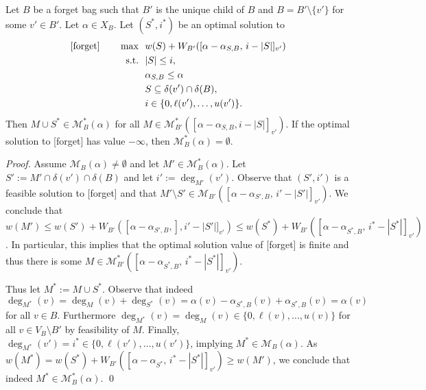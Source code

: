 \documentclass{llncs}
\begin{document}
\begin{lemma}\label{lem:forget}
	Let $B$ be a forget bag such that $B'$ is the unique child of $B$ and $B = B' \setminus \{v'\}$ for some $v' \in B'$. Let $\alpha \in X_B$. 
	Let $(S^*, i^*)$ be an optimal solution to
	\begin{align*}
	  \textup{[forget]}\qquad\max \ \ & w(S) + W_{B'}([\alpha - \alpha_{S, B},\, i - |S|]_{v'})\\
	  \textup{s.t.} \ \ & |S| \leq i,\\
	  & \alpha_{S, B} \leq \alpha\\
	  & S \subseteq \delta(v') \cap \delta(B),\\ 
	  & i \in \{0, \ell(v'), \dots, u(v')\}.
	\end{align*}
	Then $M \cup S^* \in \mathcal{M}^*_B(\alpha)$ for all $M \in \mathcal{M}_{B'}^*([\alpha - \alpha_{S, B}, i - |S|]_{v'})$. If the optimal solution to [forget] has value $-\infty$, then $\mathcal{M}^*_B(\alpha) = \emptyset$.
\end{lemma}
\begin{proof}
  Assume $\mathcal{M}_B(\alpha) \neq \emptyset$ and let $M' \in \mathcal{M}^*_B(\alpha)$. Let \mbox{$S' := M' \cap \delta(v') \cap \delta(B)$} and let $i' := \deg_{M'}(v')$. Observe that $(S', i')$ is a feasible solution to [forget] and that $M' \setminus S' \in \mathcal{M}_{B'}([\alpha - \alpha_{S',B},\, i' - |S'|]_{v'})$. We conclude that $w(M') \leq w(S') + W_{B'}([\alpha - \alpha_{S',B},], i' - |S'|]_{v'}) \leq w(S^*) + W_{B'}([\alpha - \alpha_{S^*,B},\, i^* - |S^*|]_{v'})$. In particular, this implies that the optimal solution value of [forget] is finite and thus there is some \mbox{$M \in \mathcal{M}^*_{B'}([\alpha - \alpha_{S^*,B},\, i^* - |S^*|]_{v'})$}.

  Thus let $M^* := M \cup S^*$. Observe that indeed $\deg_{M^*}(v) = \deg_M(v) + \deg_{S^*}(v) = \alpha(v) - \alpha_{S^*, B}(v) + \alpha_{S^*, B}(v) = \alpha(v)$ for all $v \in B$. Furthermore $\deg_{M^*}(v) = \deg_M(v) \in \{0, \ell(v), \dots, u(v)\}$ for all $v \in V_B \setminus B'$ by feasibility of $M$. Finally, $\deg_{M^*}(v') = i^* \in \{0, \ell(v'), \dots, u(v')\}$, implying $M^* \in \mathcal{M}_B(\alpha)$. As $w(M^*) = w(S^*) + W_{B'}([\alpha - \alpha_{S^*},\, i^* - |S^*|]_{v'}) \geq w(M')$, we conclude that indeed $M^* \in \mathcal{M}^*_B(\alpha)$.
   \qed
\end{proof}
\end{document}
